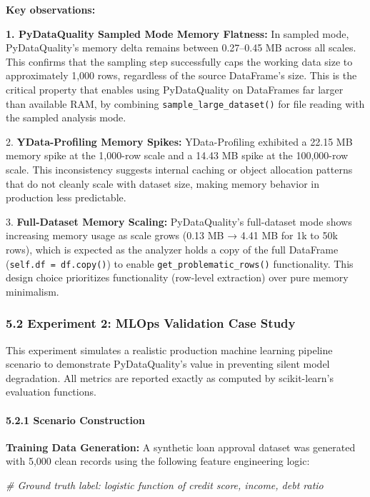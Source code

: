 \documentclass{article}
\begin{document}
\textbf{Key observations:}

\textbf{1. PyDataQuality Sampled Mode Memory Flatness:} In sampled mode,
PyDataQuality's memory delta remains between 0.27--0.45 MB across all
scales. This confirms that the sampling step successfully caps the
working data size to approximately 1,000 rows, regardless of the source
DataFrame's size. This is the critical property that enables using
PyDataQuality on DataFrames far larger than available RAM, by combining
\texttt{sample\_large\_dataset()} for file reading with the sampled
analysis mode.

2. \textbf{YData-Profiling Memory Spikes:} YData-Profiling exhibited a
22.15 MB memory spike at the 1,000-row scale and a 14.43 MB spike at the
100,000-row scale. This inconsistency suggests internal caching or
object allocation patterns that do not cleanly scale with dataset size,
making memory behavior in production less predictable.

3. \textbf{Full-Dataset Memory Scaling:} PyDataQuality's full-dataset
mode shows increasing memory usage as scale grows (0.13 MB → 4.41 MB for
1k to 50k rows), which is expected as the analyzer holds a copy of the
full DataFrame (\texttt{self.df~=~df.copy()}) to enable
\texttt{get\_problematic\_rows()} functionality. This design choice
prioritizes functionality (row-level extraction) over pure memory
minimalism.

\subsubsection{5.2 Experiment 2: MLOps Validation Case
Study}\label{experiment-2-mlops-validation-case-study}

This experiment simulates a realistic production machine learning
pipeline scenario to demonstrate PyDataQuality's value in preventing
silent model degradation. All metrics are reported exactly as computed
by scikit-learn's evaluation functions.

\paragraph{5.2.1 Scenario Construction}\label{scenario-construction}

\textbf{Training Data Generation:} A synthetic loan approval dataset was
generated with 5,000 clean records using the following feature
engineering logic:

\emph{\# Ground truth label: logistic function of credit score, income,
debt ratio}
\end{document}
